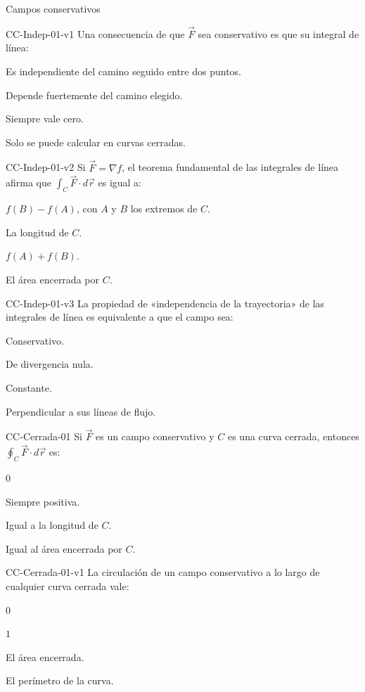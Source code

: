 \documentclass[a4,11pt]{aleph-notas}
\begin{document}
\begin{quiz}{Campos conservativos}
\begin{multi}[]%
    {CC-Indep-01-v1}
    Una consecuencia de que $\vec{F}$ sea conservativo es que su integral de línea:
    \item* Es independiente del camino seguido entre dos puntos.
    \item Depende fuertemente del camino elegido.
    \item Siempre vale cero.
    \item Solo se puede calcular en curvas cerradas.
\end{multi}

\begin{multi}[]%
    {CC-Indep-01-v2}
    Si $\vec{F}=\nabla f$, el teorema fundamental de las integrales de línea afirma que $\displaystyle\int_C \vec{F}\cdot d\vec{r}$ es igual a:
    \item* $f(B)-f(A)$, con $A$ y $B$ los extremos de $C$.
    \item La longitud de $C$.
    \item $f(A)+f(B)$.
    \item El área encerrada por $C$.
\end{multi}

\begin{multi}[]%
    {CC-Indep-01-v3}
    La propiedad de «independencia de la trayectoria» de las integrales de línea es equivalente a que el campo sea:
    \item* Conservativo.
    \item De divergencia nula.
    \item Constante.
    \item Perpendicular a sus líneas de flujo.
\end{multi}

\begin{multi}[]%
    {CC-Cerrada-01}
    Si $\vec{F}$ es un campo conservativo y $C$ es una curva cerrada, entonces $\displaystyle\oint_C \vec{F}\cdot d\vec{r}$ es:
    \item* $0$
    \item Siempre positiva.
    \item Igual a la longitud de $C$.
    \item Igual al área encerrada por $C$.
\end{multi}

\begin{multi}[]%
    {CC-Cerrada-01-v1}
    La circulación de un campo conservativo a lo largo de cualquier curva cerrada vale:
    \item* $0$
    \item $1$
    \item El área encerrada.
    \item El perímetro de la curva.
\end{multi}


\end{quiz}
\end{document}
